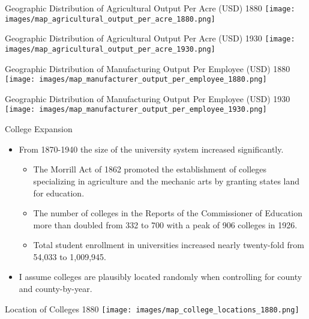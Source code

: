 \documentclass{beamer}
\begin{document}
\begin{frame}{Geographic Distribution of Agricultural Output Per Acre (USD) 1880}
\texttt{[image: images/map\_agricultural\_output\_per\_acre\_1880.png]}
\end{frame}

\begin{frame}{Geographic Distribution of Agricultural Output Per Acre (USD) 1930}
\texttt{[image: images/map\_agricultural\_output\_per\_acre\_1930.png]}
\end{frame}

\begin{frame}{Geographic Distribution of Manufacturing Output Per Employee (USD) 1880}
\texttt{[image: images/map\_manufacturer\_output\_per\_employee\_1880.png]}
\end{frame}

\begin{frame}{Geographic Distribution of Manufacturing Output Per Employee (USD) 1930}
\texttt{[image: images/map\_manufacturer\_output\_per\_employee\_1930.png]}
\end{frame}

\begin{frame}{College Expansion}
\begin{itemize}
\item From 1870-1940 the size of the university system increased significantly. 
\begin{itemize}
\item The Morrill Act of 1862 promoted the establishment of colleges specializing in agriculture and the mechanic arts by granting states land for education. 
\item The number of colleges in the Reports of the Commissioner of Education more than doubled from 332 to 700 with a peak of 906 colleges in 1926.
\item Total student enrollment in universities increased nearly twenty-fold from 54,033 to 1,009,945.
\end{itemize}
\item I assume colleges are plausibly located randomly when controlling for county and county-by-year.
\end{itemize}
\end{frame}

\begin{frame}{Location of Colleges 1880}
\texttt{[image: images/map\_college\_locations\_1880.png]}
\end{frame}
\end{document}

